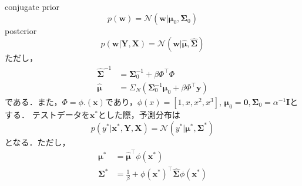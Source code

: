 conjugate prior
$$
p(\mathbf{w})=\mathcal{N}(\mathbf{w}|\boldsymbol{\mu}_0, \mathbf{\Sigma}_0)
$$
posterior
$$
p(\mathbf{w}|\mathbf{Y}, \mathbf{X})=\mathcal{N}(\mathbf{w}|\hat{\boldsymbol{\mu}}, \hat{\mathbf{\Sigma}})
$$
ただし，
$$
\begin{align}
\hat{\mathbf{\Sigma}}^{-1}&= \mathbf{\Sigma}_0^{-1}+ \beta \Phi^\top\Phi\\
\hat{\boldsymbol{\mu}}&=\Sigma_N (\mathbf{\Sigma}_0^{-1}\boldsymbol{\mu}_0+\beta \Phi^\top \mathbf{y})
\end{align}
$$
である．また，$\Phi=\phi.(\mathbf{x})$であり，$\phi(x)=[1, x, x^2, x^3]$, $\boldsymbol{\mu}_0=\mathbf{0}, \mathbf{\Sigma}_0= \alpha^{-1} \mathbf{I}$とする．
テストデータを$\mathbf{x}^*$とした際，予測分布は
$$
p(y^*|\mathbf{x}^*, \mathbf{Y}, \mathbf{X})=\mathcal{N}(y^*|\boldsymbol{\mu}^*, \mathbf{\Sigma}^*)
$$
となる．ただし，
$$
\begin{align}
\boldsymbol{\mu}^*&=\hat{\boldsymbol{\mu}}^\top \phi(\mathbf{x}^*)\\
\mathbf{\Sigma}^* &= \frac{1}{\beta} +  \phi(\mathbf{x}^*)^\top\hat{\mathbf{\Sigma}}\phi(\mathbf{x}^*)\\
\end{align}
$$